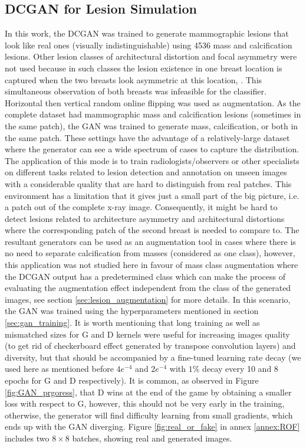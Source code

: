 \documentclass[final,3p,twocolumn,authoryear,sort&compress,times]{maia}
\begin{document}
\subsection{DCGAN for Lesion Simulation}
\label{sec:lesion_simulation}
In this work, the DCGAN was trained to generate mammographic lesions that look like real ones (visually indistinguishable) using 4536 mass and calcification lesions. Other lesion classes of architectural distortion and focal asymmetry were not used because in such classes the lesion existence in one breast location is captured when the two breasts look asymmetric at this location, \citep{rsna_architectural_distortion}. This simultaneous observation of both breasts was infeasible for the classifier. Horizontal then vertical random online flipping was used as augmentation. As the complete dataset had mammographic mass and calcification lesions (sometimes in the same patch), the GAN was trained to generate mass, calcification, or both in the same patch. These settings have the advantage of a relatively-large dataset where the generator can see a wide spectrum of cases to capture the distribution. The application of this mode is to train radiologists/observers or other specialists on different tasks related to lesion detection and annotation on unseen images with a considerable quality that are hard to distinguish from real patches. This environment has a limitation that it gives just a small part of the big picture, i.e. a patch out of the complete x-ray image. Consequently, it might be hard to detect lesions related to architecture asymmetry and architectural distortions where the corresponding patch of the second breast is needed to compare to. The resultant generators can be used as an augmentation tool in cases where there is no need to separate calcification from masses (considered as one class), however, this application was not studied here in favour of mass class augmentation
where the DCGAN output has a predetermined class which can make the process of evaluating the augmentation effect independent from the class of the generated images, see section \ref{sec:lesion_augmentation} for more details.
In this scenario, the GAN was trained using the hyperparameters mentioned in section \ref{sec:gan_training}. It is worth mentioning that long training as well as mismatched sizes for G and D kernels were useful for increasing images quality (to get rid of checkerboard effect generated by transpose convolution layers) and diversity, but that should be accompanied by a fine-tuned learning rate decay (we used here as mentioned before $4e^{-4}$ and $2 e^{-4}$ with $1\%$ decay every 10 and 8 epochs for G and D respectively). It is common, as observed in Figure \ref{fig:GAN_prgoress}, that D wins at the end of the game by obtaining a smaller loss with respect to G, however, this should not be very early in the training, otherwise, the generator will find difficulty learning from small gradients, which ends up with the GAN diverging. Figure \ref{fig:real_or_fake} in annex \ref{annex:ROF} includes two $8 \times 8$ batches, showing real and generated images.
\end{document}
